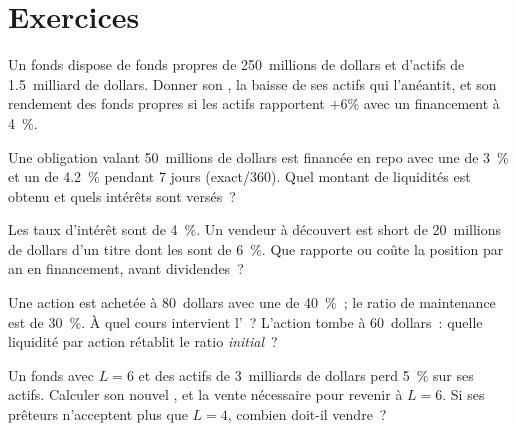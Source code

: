 \section{Exercices}

\begin{exercise}[$\star$]\label{exo:m1:financing:1}
Un fonds dispose de fonds propres de 250~millions de dollars et d'actifs de 1.5~milliard de dollars. Donner son
, la baisse de ses actifs qui l'anéantit, et son rendement des fonds propres
si les actifs rapportent $+6\%$ avec un financement à 4~\%.
\end{exercise}

\begin{exercise}[$\star$]\label{exo:m1:financing:2}
Une obligation valant 50~millions de dollars est financée en repo avec une  de 3~\% et un 
de 4.2~\% pendant 7 jours (exact/360). Quel montant de liquidités est obtenu et quels
intérêts sont versés~?
\end{exercise}

\begin{exercise}[$\star$]\label{exo:m1:financing:3}
Les taux d'intérêt sont de 4~\%. Un vendeur à découvert est short de 20~millions de dollars d'un titre dont
les  sont de 6~\%. Que rapporte ou coûte la position par an en
financement, avant dividendes~?
\end{exercise}

\begin{exercise}[$\star\star$]\label{exo:m1:financing:4}
Une action est achetée à 80~dollars avec une  de 40~\%~; le ratio de maintenance est
de 30~\%. À quel cours intervient l'~? L'action tombe à 60~dollars~: quelle
liquidité par action rétablit le ratio \emph{initial}~?
\end{exercise}

\begin{exercise}[$\star\star$]\label{exo:m1:financing:5}
Un fonds avec $L = 6$ et des actifs de 3~milliards de dollars perd 5~\% sur ses actifs.
Calculer son nouvel , et la vente nécessaire pour revenir à $L = 6$. Si ses
prêteurs n'acceptent plus que $L = 4$, combien doit-il vendre~?
\end{exercise}

